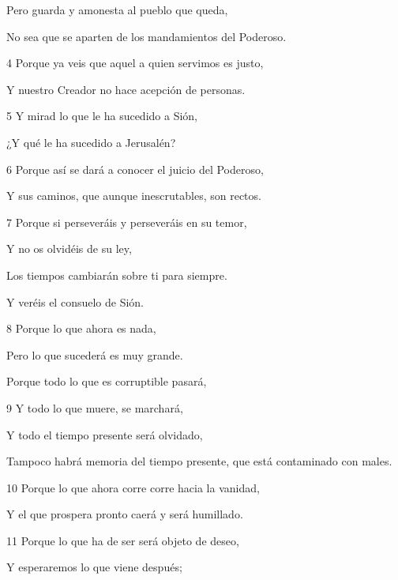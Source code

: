 \par Pero guarda y amonesta al pueblo que queda,

\par No sea que se aparten de los mandamientos del Poderoso.

\par 4 Porque ya veis que aquel a quien servimos es justo,

\par Y nuestro Creador no hace acepción de personas.

\par 5 Y mirad lo que le ha sucedido a Sión,

¿Y qué le ha sucedido a Jerusalén?

\par 6 Porque así se dará a conocer el juicio del Poderoso,

Y sus caminos, que aunque inescrutables, son rectos.

\par 7 Porque si perseveráis y perseveráis en su temor,

\par Y no os olvidéis de su ley,

\par Los tiempos cambiarán sobre ti para siempre.

\par Y veréis el consuelo de Sión.

\par 8 Porque lo que ahora es nada,

\par Pero lo que sucederá es muy grande.

\par Porque todo lo que es corruptible pasará,

\par 9 Y todo lo que muere, se marchará,

\par Y todo el tiempo presente será olvidado,

Tampoco habrá memoria del tiempo presente, que está contaminado con males.

\par 10 Porque lo que ahora corre corre hacia la vanidad,

Y el que prospera pronto caerá y será humillado.

\par 11 Porque lo que ha de ser será objeto de deseo,

Y esperaremos lo que viene después;

